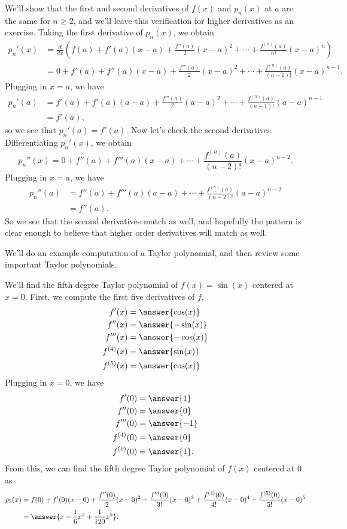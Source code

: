 \documentclass{ximera}
\begin{document}
We'll show that the first and second derivatives of $f(x)$ and $p_n(x)$ at $a$ are the same for $n\geq 2$, and we'll leave this verification for higher derivatives as an exercise. Taking the first derivative of $p_n(x)$, we obtain
\begin{align*}
p_n'(x) &=\frac{d}{dx}\left(f(a) + f'(a)(x-a) + \frac{f''(a)}{2}(x-a)^2+\cdots + \frac{f^{(n)}(a)}{n!}(x-a)^n\right)\\
&= 0 + f'(a) + f''(a)(x-a) + \frac{f'''(a)}{2}(x-a)^2 + \cdots + \frac{f^{(n)}(a)}{(n-1)!}(x-a)^{n-1}.
\end{align*}
Plugging in $x=a$, we have
\begin{align*}
p_n'(a) &= f'(a) + f'(a)(a-a) + \frac{f'''(a)}{2}(a-a)^2 + \cdots + \frac{f^{(n)}(a)}{(n-1)!}(a-a)^{n-1}\\
&= f'(a),
\end{align*}
so we see that $p_n'(a) = f'(a)$. Now let's check the second derivatives. Differentiating $p_n'(x)$, we obtain
\[
p_n''(x) = 0 + f''(a) + f'''(a)(x-a) + \cdots + \frac{f^{(n)}(a)}{(n-2)!}(x-a)^{n-2}.
\]
Plugging in $x=a$, we have
\begin{align*}
p_n''(a) &=f''(a) + f'''(a)(a-a) + \cdots + \frac{f^{(n)}(a)}{(n-2)!}(a-a)^{n-2}\\
&= f''(a).
\end{align*}
So we see that the second derivatives match as well, and hopefully the pattern is clear enough to believe that higher order derivatives will match as well.

We'll do an example computation of a Taylor polynomial, and then review some important Taylor polynomials.

\begin{example}
We'll find the fifth degree Taylor polynomial of $f(x) = \sin(x)$ centered at $x = 0$. First, we compute the first five derivatives of $f$.
\begin{align*}
f'(x) &= \answer{\cos(x)}\\
f''(x) &= \answer{-\sin(x)}\\
f'''(x) &= \answer{-\cos(x)}\\
f^{(4)}(x) &= \answer{\sin(x)}\\
f^{(5)}(x) &= \answer{\cos(x)}\\
\end{align*}
Plugging in $x = 0$, we have
\begin{align*}
f'(0) &= \answer{1}\\
f''(0) &= \answer{0}\\
f'''(0) &= \answer{-1}\\
f^{(4)}(0) &= \answer{0}\\
f^{(5)}(0) &= \answer{1}.\\
\end{align*}
From this, we can find the fifth degree Taylor polynomial of $f(x)$ centered at $0$ as
\begin{align*}
p_5(x) &= f(0) + f'(0)(x-0) + \frac{f''(0)}{2}(x-0)^2+ \frac{f'''(0)}{3!}(x-0)^3 +  \frac{f^{(4)}(0)}{4!}(x-0)^4 +  \frac{f^{(5)}(0)}{5!}(x-0)^5\\
&= \answer{x -\frac{1}{6}x^3+\frac{1}{120}x^5}.
\end{align*}
\end{example}
\end{document}
